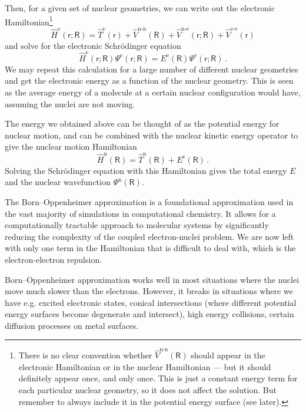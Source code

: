 \documentclass{article}
\theoremstyle{plain}\theoremheaderfont{\normalfont\itshape}\theorembodyfont{\rmfamily}\theoremseparator{.}\newtheorem*{rem}{Remark}\newtheorem*{ex}{Example}\newtheorem*{proof}{Proof}\newtheorem*{altp}{Alternative proof}
\theoremstyle{plain}\theoremheaderfont{\normalfont\bfseries}\theorembodyfont{\rmfamily}\theoremseparator{.}\newtheorem{thm}{Theorem}[section]\newtheorem{lem}[thm]{Lemma}\newtheorem{prop}[thm]{Proposition}\newtheorem*{cor}{Corollary}\newtheorem{defn}[thm]{Definition}\newtheorem{clm}[thm]{Claim}\newtheorem{clminproof}{Claim}\newtheorem{pos}{Postulate}[section]
\theoremstyle{break}\theoremheaderfont{\normalfont\itshape}\theorembodyfont{\rmfamily}\theoremseparator{.\medskip}\newtheorem*{proofskip}{Proof}\newtheorem*{exs}{Examples}\newtheorem*{rems}{Remarks}
\theoremstyle{break}\theoremheaderfont{\normalfont\bfseries}\theorembodyfont{\rmfamily}\theoremseparator{.\medskip}\newtheorem{lemskip}[thm]{Lemma}\newtheorem{defnskip}[thm]{Definition}\newtheorem{propskip}[thm]{Proposition}\newtheorem{thmskip}[thm]{Theorem}
\numberwithin{equation}{section}
\newcommand{\e}{^{\text{e}}}
\newcommand{\n}{^{\text{n}}}
\begin{document}
    Then, for a given set of nuclear geometries, we can write out the electronic Hamiltonian\footnote{There is no clear convention whether \(\hat{V}^{\text{n-n}}(\mathsf{R})\) should appear in the electronic Hamiltonian or in the nuclear Hamiltonian --- but it should definitely appear once, and only once. This is just a constant energy term for each particular nuclear geometry, so it does not affect the solution. But remember to always include it in the potential energy surface (see later).}
    \begin{equation}
        \hat{H}\e(\mathsf{r};\mathsf{R})=\hat{T}\e(\mathsf{r})+\hat{V}^{\text{n-n}}(\mathsf{R})+\hat{V}^{\text{n-e}}(\mathsf{r};\mathsf{R})+\hat{V}^{\text{e-e}}(\mathsf{r})
    \end{equation}
    and solve for the electronic Schr\"{o}dinger equation
    \begin{equation}
        \hat{H}\e(\mathsf{r};\mathsf{R})\Psi\e(\mathsf{r};\mathsf{R})=E\e(\mathsf{R})\Psi\e(\mathsf{r};\mathsf{R})\,.
    \end{equation}
    We may repeat this calculation for a large number of different nuclear geometries and get the electronic energy as a function of the nuclear geometry. This is seen as the average energy of a molecule at a certain nuclear configuration would have, assuming the nuclei are not moving.
    
    The energy we obtained above can be thought of as the potential energy for nuclear motion, and can be combined with the nuclear kinetic energy operator to give the nuclear motion Hamiltonian
    \begin{equation}
        \hat{H}\n(\mathsf{R})=\hat{T}\n(\mathsf{R})+E\e(\mathsf{R})\,.
    \end{equation}
    Solving the Schr\"{o}dinger equation with this Hamiltonian gives the total energy \(E\) and the nuclear wavefunction \(\Psi\n(\mathsf{R})\).

    The Born--Oppenheimer approximation is a foundational approximation used in the vast majority of simulations in computational chemistry. It allows for a computationally tractable approach to molecular systems by significantly reducing the complexity of the coupled electron-nuclei problem. We are now left with only one term in the Hamiltonian that is difficult to deal with, which is the electron-electron repulsion.
    
    
    Born--Oppenheimer approximation works well in most situations where the nuclei move much slower than the electrons. However, it breaks in situations where we have e.g. excited electronic states, conical intersections (where different potential energy surfaces become degenerate and intersect), high energy collisions, certain diffusion processes on metal surfaces.
\end{document}
